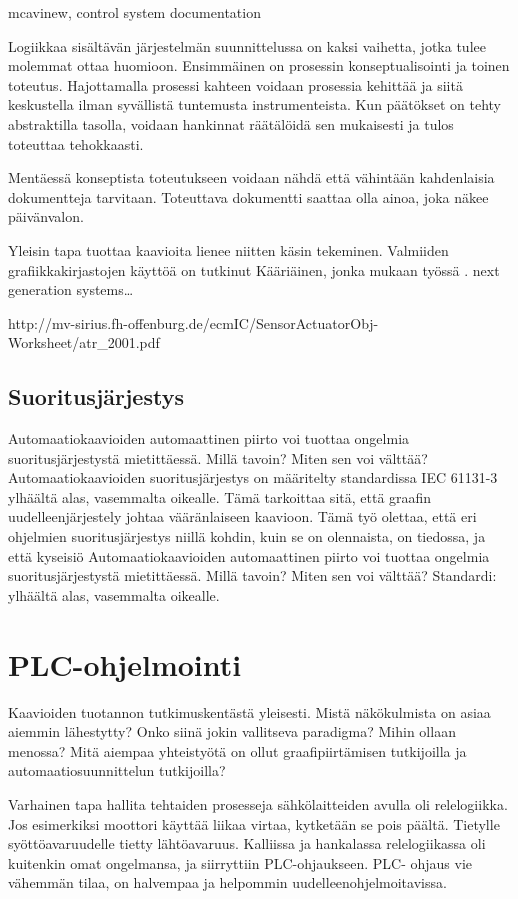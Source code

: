 \documentclass[finnish,12pt]{article}
\begin{document}
mcavinew, control system documentation

Logiikkaa sisältävän järjestelmän suunnittelussa on kaksi vaihetta, jotka tulee molemmat ottaa huomioon.
Ensimmäinen on prosessin konseptualisointi ja toinen toteutus.
Hajottamalla prosessi kahteen voidaan prosessia kehittää ja siitä keskustella ilman syvällistä tuntemusta instrumenteista.
Kun päätökset on tehty abstraktilla tasolla, voidaan hankinnat räätälöidä sen mukaisesti ja tulos toteuttaa tehokkaasti.

Mentäessä konseptista toteutukseen voidaan nähdä että vähintään kahdenlaisia dokumentteja tarvitaan.
Toteuttava dokumentti saattaa olla ainoa, joka näkee päivänvalon. 

Yleisin tapa tuottaa kaavioita lienee niitten käsin tekeminen.
Valmiiden grafiikkakirjastojen käyttöä on tutkinut Kääriäinen, jonka mukaan työssä .
next generation systems…

http://mv-sirius.fh-offenburg.de/ecmIC/SensorActuatorObj-Worksheet/atr_2001.pdf

	\subsection{Suoritusjärjestys}
	
Automaatiokaavioiden automaattinen piirto voi tuottaa ongelmia suoritusjärjestystä mietittäessä. 
Millä tavoin?
Miten sen voi välttää?
Automaatiokaavioiden suoritusjärjestys on määritelty standardissa IEC 61131-3 ylhäältä alas, vasemmalta oikealle.
Tämä tarkoittaa sitä, että graafin uudelleenjärjestely johtaa vääränlaiseen kaavioon.
Tämä työ olettaa, että eri ohjelmien suoritusjärjestys niillä kohdin, kuin se on olennaista, on tiedossa, ja että kyseisiö
Automaatiokaavioiden automaattinen piirto voi tuottaa ongelmia suoritusjärjestystä mietittäessä. 
Millä tavoin?
Miten sen voi välttää?
Standardi: ylhäältä alas, vasemmalta oikealle.

	\clearpage
	\section{PLC-ohjelmointi}

Kaavioiden tuotannon tutkimuskentästä yleisesti.
Mistä näkökulmista on asiaa aiemmin lähestytty?
Onko siinä jokin vallitseva paradigma?
Mihin ollaan menossa?
Mitä aiempaa yhteistyötä on ollut graafipiirtämisen tutkijoilla ja automaatiosuunnittelun tutkijoilla?

Varhainen tapa hallita tehtaiden prosesseja sähkölaitteiden avulla oli relelogiikka.
Jos esimerkiksi moottori käyttää liikaa virtaa, kytketään se pois päältä.
Tietylle syöttöavaruudelle tietty lähtöavaruus.
Kalliissa ja hankalassa relelogiikassa oli kuitenkin omat ongelmansa, ja siirryttiin PLC-ohjaukseen.
PLC- ohjaus vie vähemmän tilaa, on halvempaa ja helpommin uudelleenohjelmoitavissa.
\end{document}
